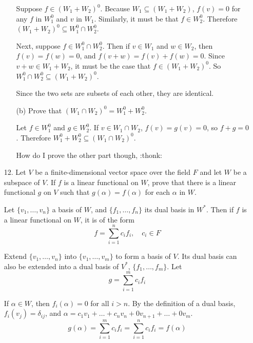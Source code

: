 \documentclass{article}
\begin{document}
\begin{enumerate}[listparindent=\parindent]
\begin{enumerate}[listparindent=\parindent]
            Suppose \(f \in (W_1 + W_2)^0\).
            Because \(W_1 \subseteq (W_1 + W_2)\), \(f(v) = 0\) for any \(f\) in \(W_1^0\) and \(v\) in \(W_1\).
            Similarly, it must be that \(f \in W_2^0\).
            Therefore \((W_1 + W_2)^0 \subseteq W_1^0 \cap W_2^0\).

            Next, suppose \(f \in W_1^0 \cap W_2^0\).
            Then if \(v \in W_1\) and \(w \in W_2\), then \(f(v) = f(w) = 0\), and \(f(v + w) = f(v) + f(w) = 0\).
            Since \(v + w \in W_1 + W_2\), it must be the case that \(f \in (W_1 + W_2)^0\).
            So \(W_1^0 \cap W_2^0 \subseteq (W_1 + W_2)^0\). 

            Since the two sets are subsets of each other, they are identical.

        \item[(b)] Prove that \((W_1 \cap W_2)^0 = W_1^0 + W_2^0\).

            Let \(f \in W_1^0\) and \(g \in W_2^0\).
            If \(v \in W_1 \cap W_2\), \(f(v) = g(v) = 0\), so \(f + g = 0\).
            Therefore \(W_1^0 + W_2^0 \subseteq (W_1 \cap W_2)^0\).

            How do I prove the other part though, :thonk:

    \end{enumerate}

\item[12.] Let \(V\) be a finite-dimensional vector space over the field \(F\) and let \(W\) be a subspace of \(V\).
    If \(f\) is a linear functional on \(W\), prove that there is a linear functional \(g\) on \(V\) such that \(g(\alpha) = f(\alpha)\) for each \(\alpha\) in \(W\).

    Let \(\{v_1, \dots, v_n\}\) a basis of \(W\), and \(\{f_1, \dots, f_n\}\) its dual basis in \(W^*\).
    Then if \(f\) is a linear functional on \(W\), it is of the form
    \[ f = \sum_{i=1}^n c_if_i,\quad c_i \in F \]

    Extend \(\{v_1, \dots, v_n\}\) into \(\{v_1, \dots, v_m\}\) to form a basis of \(V\).
    Its dual basis can also be extended into a dual basis of \(V^*\), \(\{f_1, \dots, f_m\}\). Let
    \[ g = \sum_{i=1}^m c_if_i \]

    If \(\alpha \in W\), then \(f_i(\alpha) = 0\) for all \(i > n\).
    By the definition of a dual basis, \(f_i(v_j) = \delta_{ij}\), and \(\alpha = c_1v_1 + \dots + c_nv_n + 0v_{n+1} + \dots + 0v_m\).
    \[ g(\alpha) = \sum_{i=1}^m c_if_i = \sum_{i=1}^n c_if_i = f(\alpha) \]


\end{enumerate}
\end{document}
